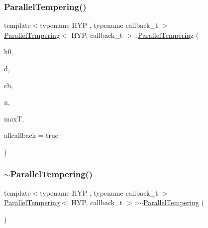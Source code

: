 \mbox{\label{class_parallel_tempering_a28bc2e02ad875e2b1cfcde9e428bf97e}} 
\subsubsection{\texorpdfstring{Parallel\+Tempering()}{ParallelTempering()}\hspace{0.1cm}{\footnotesize\ttfamily [2/2]}}
{\footnotesize\ttfamily template$<$typename H\+YP , typename callback\+\_\+t $>$ \\
\hyperlink{class_parallel_tempering}{Parallel\+Tempering}$<$ H\+YP, callback\+\_\+t $>$\+::\hyperlink{class_parallel_tempering}{Parallel\+Tempering} (\begin{DoxyParamCaption}\item[{H\+YP \&}]{h0,  }\item[{typename H\+Y\+P\+::data\+\_\+t $\ast$}]{d,  }\item[{callback\+\_\+t \&}]{cb,  }\item[{unsigned long}]{n,  }\item[{double}]{maxT,  }\item[{bool}]{allcallback = {\ttfamily true} }\end{DoxyParamCaption})\hspace{0.3cm}{\ttfamily [inline]}}

\mbox{\label{class_parallel_tempering_a96763c107a95f4a120f2b65c896cb5b2}} 
\subsubsection{\texorpdfstring{$\sim$\+Parallel\+Tempering()}{~ParallelTempering()}}
{\footnotesize\ttfamily template$<$typename H\+YP , typename callback\+\_\+t $>$ \\
\hyperlink{class_parallel_tempering}{Parallel\+Tempering}$<$ H\+YP, callback\+\_\+t $>$\+::$\sim$\hyperlink{class_parallel_tempering}{Parallel\+Tempering} (\begin{DoxyParamCaption}{ }\end{DoxyParamCaption})\hspace{0.3cm}{\ttfamily [inline]}}



